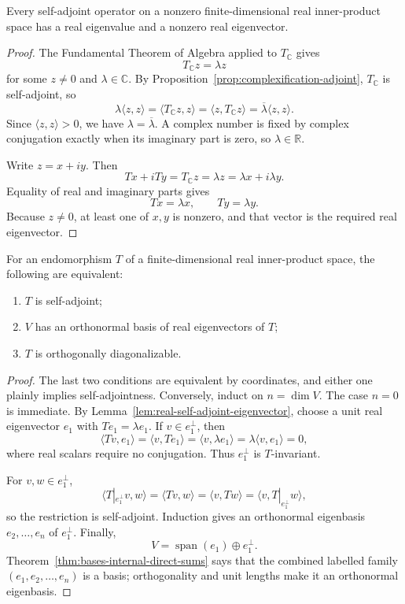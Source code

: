 \begin{lemma}
\label{lem:real-self-adjoint-eigenvector}
Every self-adjoint operator on a nonzero finite-dimensional real
inner-product space has a real eigenvalue and a nonzero real eigenvector.
\end{lemma}
\begin{proof}
The Fundamental Theorem of Algebra applied to \(T_{\mathbb C}\) gives
\[
T_{\mathbb C}z=\lambda z
\]
for some \(z\ne0\) and \(\lambda\in\mathbb C\).  By
Proposition~\ref{prop:complexification-adjoint}, \(T_{\mathbb C}\) is
self-adjoint, so
\[
\lambda\langle z,z\rangle
=\langle T_{\mathbb C}z,z\rangle
=\langle z,T_{\mathbb C}z\rangle
=\overline{\lambda}\langle z,z\rangle.
\]
Since \(\langle z,z\rangle>0\), we have
\(\lambda=\overline{\lambda}\).  A complex number is fixed by complex
conjugation exactly when its imaginary part is zero, so \(\lambda\in\mathbb R\).

Write \(z=x+iy\).  Then
\[
Tx+iTy=T_{\mathbb C}z=\lambda z=\lambda x+i\lambda y.
\]
Equality of real and imaginary parts gives
\[
Tx=\lambda x,\qquad Ty=\lambda y.
\]
Because \(z\ne0\), at least one of \(x,y\) is nonzero, and that vector is the
required real eigenvector.
\end{proof}

\begin{corollary}
For an endomorphism \(T\) of a finite-dimensional real inner-product space,
the following are equivalent:
\begin{enumerate}
\item \(T\) is self-adjoint;
\item \(V\) has an orthonormal basis of real eigenvectors of \(T\);
\item \(T\) is orthogonally diagonalizable.
\end{enumerate}
\end{corollary}
\begin{proof}
The last two conditions are equivalent by coordinates, and either one plainly
implies self-adjointness.  Conversely, induct on \(n=\dim V\).  The case
\(n=0\) is immediate.  By
Lemma~\ref{lem:real-self-adjoint-eigenvector}, choose a unit real eigenvector
\(e_1\) with \(Te_1=\lambda e_1\).  If \(v\in e_1^\perp\), then
\[
\langle Tv,e_1\rangle
=\langle v,Te_1\rangle
=\langle v,\lambda e_1\rangle
=\lambda\langle v,e_1\rangle=0,
\]
where real scalars require no conjugation.  Thus \(e_1^\perp\) is
\(T\)-invariant.

For \(v,w\in e_1^\perp\),
\[
\langle T|_{e_1^\perp}v,w\rangle
=\langle Tv,w\rangle
=\langle v,Tw\rangle
=\langle v,T|_{e_1^\perp}w\rangle,
\]
so the restriction is self-adjoint.  Induction gives an orthonormal
eigenbasis \(e_2,\ldots,e_n\) of \(e_1^\perp\).  Finally,
\[
V=\operatorname{span}(e_1)\oplus e_1^\perp.
\]
Theorem~\ref{thm:bases-internal-direct-sums} says that the combined labelled
family \((e_1,e_2,\ldots,e_n)\) is a basis; orthogonality and unit lengths make
it an orthonormal eigenbasis.
\end{proof}

